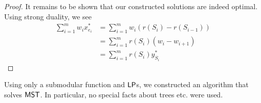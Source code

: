 \begin{proof}
    It remains to be shown that our constructed solutions are indeed optimal.
    Using strong duality, we see
    \begin{align*}
        \sum_{i=1}^m w_i x_{e_i}^* & = \sum_{i=1}^m w_i (r(S_i) - r(S_{i-1})) \\
                                   & = \sum_{i=1}^m r(S_i)(w_i - w_{i+1})     \\
                                   & = \sum_{i=1}^m r(S_i)y_{S_i}^*
    \end{align*}
\end{proof}
\begin{conclusion}
    Using only a submodular function and $\mathsf{LP}$s, we constructed an algorithm that
    solves $\mathsf{MST}$. In particular, no special facts about trees etc. were used.
\end{conclusion}
